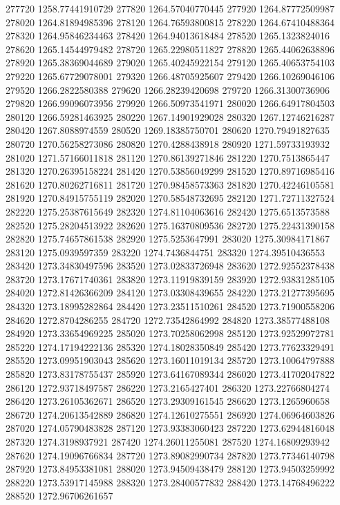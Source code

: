 {277720 1258.77441910729
277820 1264.57040770445
277920 1264.87772509987
278020 1264.81894985396
278120 1264.76593800815
278220 1264.67410488364
278320 1264.95846234463
278420 1264.94013618484
278520 1265.1323824016
278620 1265.14544979482
278720 1265.22980511827
278820 1265.44062638896
278920 1265.38369044689
279020 1265.40245922154
279120 1265.40653754103
279220 1265.67729078001
279320 1266.48705925607
279420 1266.10269046106
279520 1266.2822580388
279620 1266.28239420698
279720 1266.31300736906
279820 1266.99096073956
279920 1266.50973541971
280020 1266.64917804503
280120 1266.59281463925
280220 1267.14901929028
280320 1267.12746216287
280420 1267.8088974559
280520 1269.18385750701
280620 1270.79491827635
280720 1270.56258273086
280820 1270.4288438918
280920 1271.59733193932
281020 1271.57166011818
281120 1270.86139271846
281220 1270.7513865447
281320 1270.26395158224
281420 1270.53856049299
281520 1270.89716985416
281620 1270.80262716811
281720 1270.98458573363
281820 1270.42246105581
281920 1270.84915755119
282020 1270.58548732695
282120 1271.72711327524
282220 1275.25387615649
282320 1274.81104063616
282420 1275.6513573588
282520 1275.28204513922
282620 1275.16370809536
282720 1275.22431390158
282820 1275.74657861538
282920 1275.5253647991
283020 1275.30984171867
283120 1275.0939597359
283220 1274.7436844751
283320 1274.39510436553
283420 1273.34830497596
283520 1273.02833726948
283620 1272.92552378438
283720 1273.17671740361
283820 1273.11919839159
283920 1272.93831285105
284020 1272.81426366209
284120 1273.03308439655
284220 1273.21277395695
284320 1273.18995282864
284420 1273.23511510261
284520 1273.71900558206
284620 1272.8704286255
284720 1272.73542864992
284820 1273.38577488108
284920 1273.33654969225
285020 1273.70258062998
285120 1273.92529972781
285220 1274.17194222136
285320 1274.18028350849
285420 1273.77623329491
285520 1273.09951903043
285620 1273.16011019134
285720 1273.10064797888
285820 1273.83178755437
285920 1273.64167089344
286020 1273.41702047822
286120 1272.93718497587
286220 1273.2165427401
286320 1273.22766804274
286420 1273.26105362671
286520 1273.29309161545
286620 1273.1265960658
286720 1274.20613542889
286820 1274.12610275551
286920 1274.06964603826
287020 1274.05790483828
287120 1273.93383060423
287220 1273.62944816048
287320 1274.3198937921
287420 1274.26011255081
287520 1274.16809293942
287620 1274.19096766834
287720 1273.89082990734
287820 1273.77346140798
287920 1273.84953381081
288020 1273.94509438479
288120 1273.94503259992
288220 1273.53917145988
288320 1273.28400577832
288420 1273.14768496222
288520 1272.96706261657
}
